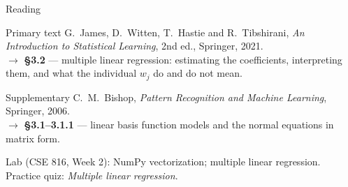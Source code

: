 \documentclass[aspectratio=169,10pt]{beamer}
\begin{document}
\begin{frame}{Reading}
  \begin{block}{Primary text}
    G.~James, D.~Witten, T.~Hastie and R.~Tibshirani,
    \emph{An Introduction to Statistical Learning}, 2nd ed., Springer, 2021.\\[2pt]
    \hfill{\small$\rightarrow$ \textbf{\S3.2} --- multiple linear regression: estimating the
    coefficients, interpreting them, and what the individual $w_j$ do and do not mean.}
  \end{block}
  \begin{block}{Supplementary}
    C.~M.~Bishop, \emph{Pattern Recognition and Machine Learning}, Springer, 2006.\\[2pt]
    \hfill{\small$\rightarrow$ \textbf{\S3.1--3.1.1} --- linear basis function models and the
    normal equations in matrix form.}
  \end{block}
  \vspace{2mm}
  \begin{center}
    \small\color{cugray}
    Lab (CSE 816, Week 2): NumPy vectorization; multiple linear regression.\\
    Practice quiz: \emph{Multiple linear regression}.
  \end{center}
\end{frame}
\end{document}
